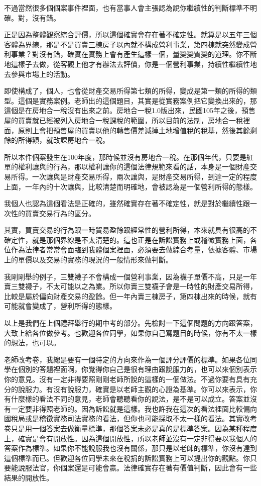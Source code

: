 \documentclass[oneside,sub3section]{ctexbook}
\begin{document}
不過當然很多個個案事件裡面，也有當事人會主張認為說你繼續性的判斷標準不明確。對，沒有錯。

正是因為整體觀察綜合評價，所以這個確實會存在著不確定性。就算是以五年三個客體為界線，那是不是買賣三棟房子以內就不構成營利事業，第四棟就突然變成營利事業？對沒有錯，確實在實務上會有產生這樣一個，量變變質變的道理。你不斷地這樣子去做，從客觀上他才有辦法去評價，你是一個營利事業，持續性繼續性地去參與市場上的活動。

即使構成了，個人，也會從財產交易所得第七類的所得，變成是第一類的所得的類型。這個是實務案例。老師出的這個題目，其實是從實務案例把它變換出來的，那這個是在房地合一稅沒有出來之前。房地合一稅1.0版出來，民國105年之後，預售屋的買賣就已經被列入房地合一稅課稅的範圍，所以目前的法制，房地合一稅裡面，原則上會把預售屋的買賣以他的轉售價差減掉土地增值稅的稅基，然後其餘剩餘的所得額，就改課房地合一稅。

所以本件個案發生在100年度，那時候並沒有房地合一稅。在那個年代，只要是紅單的權利讓與的行為，那以權利讓你的這個法律規範來看的話，本身是一個財產交易所得。一次讓與是財產交易所得，兩次讓與，是財產交易所得，到達一定的程度上面，一年內的十次讓與，比較清楚而明確地，會被認為是一個營利所得的態樣。

我個人也認為這個看法是正確的，雖然確實存在著不確定性，就是對於繼續性跟一次性的買賣交易行為的區分。

其實，買賣交易的行為跟一時貿易盈餘跟經常性的營利所得，本來就具有很高的不確定性，就是那個界線是不太清楚的。這也正是在訴訟實務上或稽徵實務上面，各位作為法律者常常會面臨到我體個案裡面，必須要去做綜合考量，依據客體、市場上的單價以及交易的實務的現況的一般情形來做判斷。

我剛剛舉的例子，三雙襪子不會構成一個營利事業，因為襪子單價不高，只是一年賣三雙襪子，不太可能以之為業。所以你賣三雙襪子會是一時性的財產交易所得，比較是屬於偏向財產交易的盈餘。但一年內賣三棟房子，第四棟出來的時候，就有可能就會變成了，營利所得的態樣。

以上是我們在上個禮拜舉行的期中考的部分。先檢討一下這個問題的方向跟答案，大致上給各位做參考。也歡迎各位同學，如果你自己寫題目的時候，你有不太一樣的想法，也可以。

老師改考卷，我總是要有一個特定的方向來作為一個評分評價的標準。如果各位同學在個別的答題裡面啊，你覺得你自己是很有理由跟說服力的，也可以來個別表示你的意見。沒有一定非得要照剛剛老師所說的這樣的一個做法。不過你要有具有充分的說服力。有沒有說服力，確實是以老師主觀的心證為基準。你可以來表示，你有什麼樣的看法不同的意見，老師會聽聽看你的說法，是不是可以成立。答案並沒有一定要非得照老師的。因為訴訟就是這樣。我也許我在這次的看法裡面比較偏向國稅局或是稽徵實務司法實務的看法，但你也可能採取不太一樣的看法。其實改考卷只是用一個答案去做衡量標準，那個答案未必是真的是標準答案。因為某種程度上，確實是會有開放性。因為這個開放性，所以老師並沒有一定非得要以我個人的答案作為標準。如果你不能說服我也沒有關係，那只是以老師的標準，你沒有達到這個標準而已。但歡迎各位同學未來在稅捐的訴訟實務上可以提出你的觀點。你只要能說服法官，你個案還是可能會贏。法律確實存在著有價值判斷，因此會有一些結果的開放性。
\end{document}
